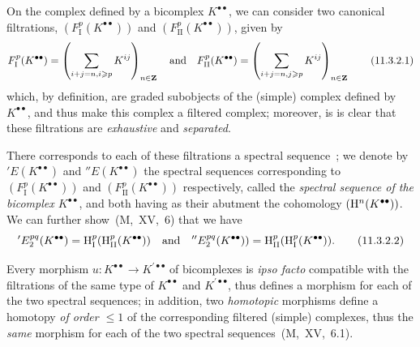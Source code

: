 \begin{env}[11.3.2]
\label{0.11.3.2}
On the complex defined by a bicomplex $K^{\bullet\bullet}$, we can consider two canonical filtrations, $(F_\mathrm{I}^p(K^{\bullet\bullet}))$ and $(F_\mathrm{II}^p(K^{\bullet\bullet}))$, given by
\[
\label{0.11.3.2.1}
  F_\mathrm{I}^p(K^{\bullet\bullet})
  = \left(\sum_{i+j=n,i\geqslant p}K^{ij}\right)_{n\in\mathbf{Z}}
  \quad\text{and}\quad
  F_\mathrm{II}^p(K^{\bullet\bullet})
  = \left(\sum_{i+j=n,j\geqslant p}K^{ij}\right)_{n\in\mathbf{Z}}
  \tag{11.3.2.1}
\]
which, by definition, are graded subobjects of the (simple) complex defined by $K^{\bullet\bullet}$, and thus make this complex a filtered complex;
moreover, is is clear that these filtrations are \emph{exhaustive} and \emph{separated}.

There corresponds to each of these filtrations a spectral sequence~;
we denote by $'E(K^{\bullet\bullet})$ and $''E(K^{\bullet\bullet})$ the spectral sequences corresponding to $(F_\mathrm{I}^p(K^{\bullet\bullet}))$ and $(F_\mathrm{II}^p(K^{\bullet\bullet}))$ respectively, called the \emph{spectral sequence of the bicomplex $K^{\bullet\bullet}$}, and both having as their abutment the cohomology $(\mathrm{H}^n(K^{\bullet\bullet}))$.
We can further show~(M,~XV,~6) that we have
\[
\label{0.11.3.2.2}
  'E_2^{pq}(K^{\bullet\bullet})
  = \mathrm{H}_\mathrm{I}^p(\mathrm{H}_\mathrm{II}^p(K^{\bullet\bullet}))
  \quad\text{and}\quad
  ''E_2^{pq}(K^{\bullet\bullet}))
  = \mathrm{H}_\mathrm{II}^p(\mathrm{H}_\mathrm{I}^p(K^{\bullet\bullet})).
  \tag{11.3.2.2}
\]

Every morphism $u:K^{\bullet\bullet}\to K^{\prime\bullet\bullet}$ of bicomplexes is \emph{ipso facto} compatible with the filtrations of the same type of $K^{\bullet\bullet}$ and $K^{\prime\bullet\bullet}$, thus defines a morphism for each of the two spectral sequences;
in addition, two \emph{homotopic} morphisms define a homotopy \emph{of order $\leq 1$} of the corresponding filtered (simple) complexes, thus the \emph{same} morphism for each of the two spectral sequences~(M,~XV,~6.1).
\end{env}

